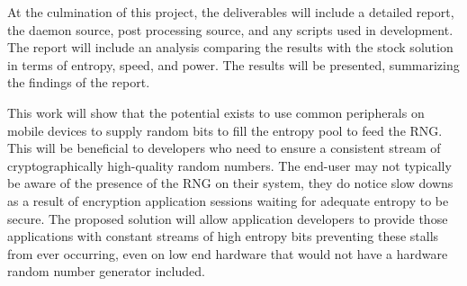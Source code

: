 
At the culmination of this project, the deliverables will include a detailed
report, the daemon source, post processing source, and any scripts used in
development. The report will include an analysis comparing the results with the
stock solution in terms of entropy, speed, and power. The results will be
presented, summarizing the findings of the report. 

This work will show that the potential exists to use common peripherals on
mobile devices to supply random bits to fill the entropy pool to feed the RNG.
This will be beneficial to developers who need to ensure a consistent stream of
cryptographically high-quality random numbers. The end-user may not typically be
aware of the presence of the RNG on their system, they do notice slow downs as a
result of encryption application sessions waiting for adequate entropy to be
secure. The proposed solution will allow application developers to
provide those applications with constant streams of high entropy bits preventing
these stalls from ever occurring, even on low end hardware that would not have a
hardware random number generator included.
